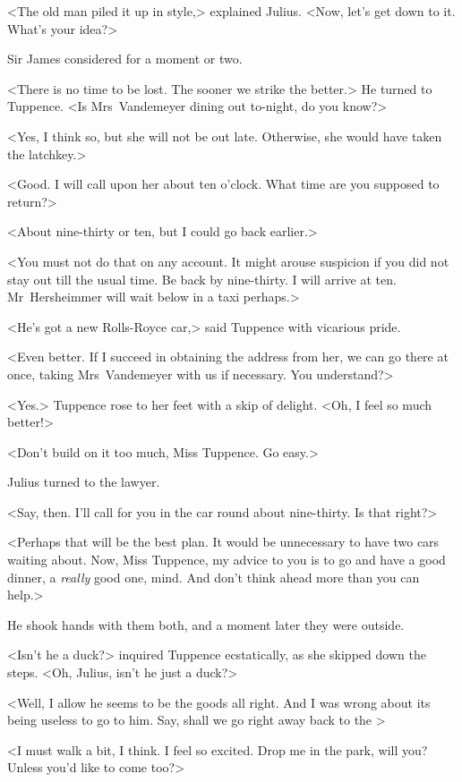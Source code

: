 <The old man piled it up in style,> explained Julius. <Now, let's get down to it. What's your idea?>

Sir James considered for a moment or two.

<There is no time to be lost. The sooner we strike the better.> He turned to Tuppence. <Is Mrs~Vandemeyer dining out to-night, do you know?>

<Yes, I think so, but she will not be out late. Otherwise, she would have taken the latchkey.>

<Good. I will call upon her about ten o'clock. What time are you supposed to return?>

<About nine-thirty or ten, but I could go back earlier.>

<You must not do that on any account. It might arouse suspicion if you did not stay out till the usual time. Be back by nine-thirty. I will arrive at ten. Mr~Hersheimmer will wait below in a taxi perhaps.>

<He's got a new Rolls-Royce car,> said Tuppence with vicarious pride.

<Even better. If I succeed in obtaining the address from her, we can go there at once, taking Mrs~Vandemeyer with us if necessary. You understand?>

<Yes.> Tuppence rose to her feet with a skip of delight. <Oh, I feel so much better!>

<Don't build on it too much, Miss Tuppence. Go easy.>

Julius turned to the lawyer.

<Say, then. I'll call for you in the car round about nine-thirty. Is that right?>

<Perhaps that will be the best plan. It would be unnecessary to have two cars waiting about. Now, Miss Tuppence, my advice to you is to go and have a good dinner, a \emph{really} good one, mind. And don't think ahead more than you can help.>

He shook hands with them both, and a moment later they were outside.

<Isn't he a duck?> inquired Tuppence ecstatically, as she skipped down the steps. <Oh, Julius, isn't he just a duck?>

<Well, I allow he seems to be the goods all right. And I was wrong about its being useless to go to him. Say, shall we go right away back to the >

<I must walk a bit, I think. I feel so excited. Drop me in the park, will you? Unless you'd like to come too?>

